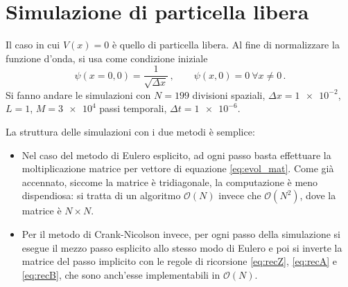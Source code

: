 \documentclass[a4paper, titlepage]{article}
\numberwithin{equation}{section}
\begin{document}
\section{Simulazione di particella libera}
Il caso in cui $V(x) = 0$ è quello di particella libera. Al fine di normalizzare la funzione d'onda, si usa come condizione iniziale
\begin{equation}
    \psi(x = 0, 0) = \frac{1}{\sqrt{\Delta x}}\, ,
    \qquad
    \psi(x,0) = 0\ \forall x \neq 0\, .
    \label{eq:initial}
\end{equation}
Si fanno andare le simulazioni con $N = 199$ divisioni spaziali, $\Delta x = \num{1e-2}$, $L=1$, $M = \num{3e4}$ passi temporali, $\Delta t = \num{1e-6}$. 

La struttura delle simulazioni con i due metodi è semplice:
\begin{itemize}
    \item Nel caso del metodo di Eulero esplicito, ad ogni passo basta effettuare la moltiplicazione matrice per vettore di equazione \eqref{eq:evol_mat}. Come già accennato, siccome la matrice è tridiagonale, la computazione è meno dispendiosa: si tratta di un algoritmo $\mathcal{O}(N)$ invece che $\mathcal{O}(N^2)$, dove la matrice è $N\times N$.
    \item Per il metodo di Crank-Nicolson invece, per ogni passo della simulazione si esegue il mezzo passo esplicito allo stesso modo di Eulero e poi si inverte la matrice del passo implicito con le regole di ricorsione \eqref{eq:recZ}, \eqref{eq:recA} e \eqref{eq:recB}, che sono anch'esse implementabili in $\mathcal{O}(N)$.
\end{itemize}
\end{document}

